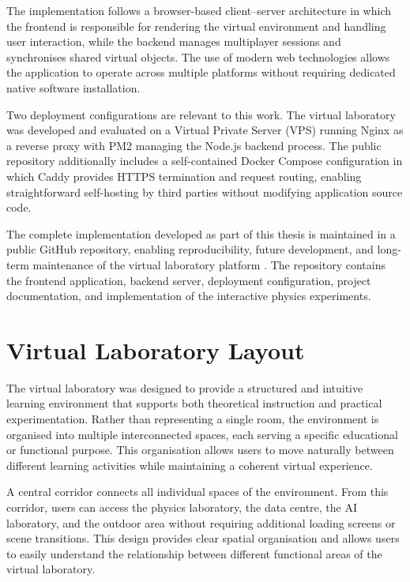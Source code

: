 The implementation follows a browser-based client--server architecture in which the frontend is responsible for rendering the virtual environment and handling user interaction, while the backend manages multiplayer sessions and synchronises shared virtual objects. The use of modern web technologies allows the application to operate across multiple platforms without requiring dedicated native software installation.

Two deployment configurations are relevant to this work. The virtual laboratory was developed and evaluated on a Virtual Private Server (VPS) running Nginx as a reverse proxy with PM2 managing the Node.js backend process. The public repository additionally includes a self-contained Docker Compose configuration in which Caddy provides HTTPS termination and request routing, enabling straightforward self-hosting by third parties without modifying application source code.

The complete implementation developed as part of this thesis is maintained in a public GitHub repository, enabling reproducibility, future development, and long-term maintenance of the virtual laboratory platform \cite{thesisRepo}. The repository contains the frontend application, backend server, deployment configuration, project documentation, and implementation of the interactive physics experiments.

\section{Virtual Laboratory Layout}

The virtual laboratory was designed to provide a structured and intuitive learning environment that supports both theoretical instruction and practical experimentation. Rather than representing a single room, the environment is organised into multiple interconnected spaces, each serving a specific educational or functional purpose. This organisation allows users to move naturally between different learning activities while maintaining a coherent virtual experience.

A central corridor connects all individual spaces of the environment. From this corridor, users can access the physics laboratory, the data centre, the AI laboratory, and the outdoor area without requiring additional loading screens or scene transitions. This design provides clear spatial organisation and allows users to easily understand the relationship between different functional areas of the virtual laboratory.

